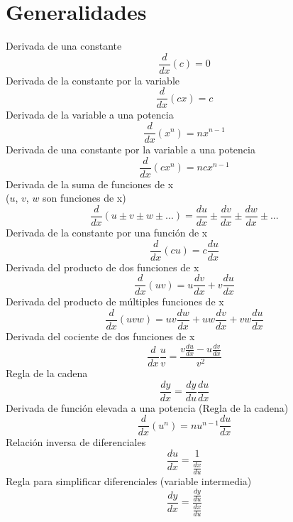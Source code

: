 \section{Generalidades}
Derivada de una constante
\begin{equation}
	\frac{d}{dx}(c)=0
\end{equation}
Derivada de la constante por la variable
\begin{equation}
	\frac{d}{dx}(cx)=c
\end{equation}
Derivada de la variable a una potencia
\begin{equation}
	\frac{d}{dx}(x^n)=nx^{n-1}
\end{equation}
Derivada de una constante por la variable a una potencia
\begin{equation}
	\frac{d}{dx}(cx^n)=ncx^{n-1}
\end{equation}
Derivada de la suma de funciones de x\\
($u$, $v$, $w$ son funciones de x)
\begin{equation}
	\frac{d}{dx}(u\pm v\pm w \pm ...)=\frac{du}{dx}\pm\frac{dv}{dx}\pm\frac{dw}{dx}\pm...
\end{equation}
Derivada de la constante por una función de x
\begin{equation}
	\frac{d}{dx}(cu)=c\frac{du}{dx}
\end{equation}
Derivada del producto de dos funciones de x
\begin{equation}
	\frac{d}{dx}(uv)=u\frac{dv}{dx}+v\frac{du}{dx}
\end{equation}
Derivada del producto de múltiples funciones de x
\begin{equation}
	\frac{d}{dx}(uvw)=uv\frac{dw}{dx}+uw\frac{dv}{dx}+vw\frac{du}{dx}
\end{equation}
Derivada del cociente de dos funciones de x
\begin{equation}
	\frac{d}{dx}\frac{u}{v}=\frac{v\frac{du}{dx}-u\frac{dv}{dx}}{v^2}
\end{equation}
Regla de la cadena
\begin{equation}
	\frac{dy}{dx}=\frac{dy}{du}\frac{du}{dx}
\end{equation}
Derivada de función elevada a una potencia (Regla de la cadena)
\begin{equation}
	\frac{d}{dx}(u^n)=nu^{n-1}\frac{du}{dx}
\end{equation}
Relación inversa de diferenciales
\begin{equation}
	\frac{du}{dx}=\frac{1}{\frac{dx}{du}}
\end{equation}
Regla para simplificar diferenciales (variable intermedia)
\begin{equation}
	\frac{dy}{dx}=\frac{\frac{dy}{du}}{\frac{dx}{du}}
\end{equation}
